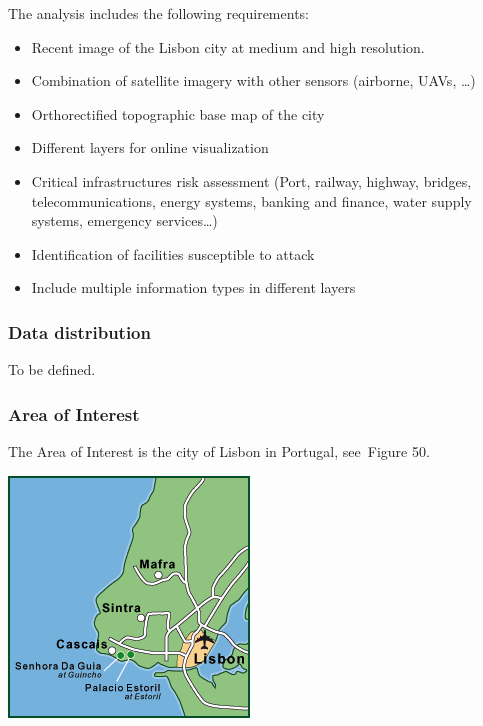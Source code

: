 \documentclass[a4paper]{article}
\newcommand\liststyleLFOviii{%
\renewcommand\labelitemi{[F0B7?]}
\renewcommand\labelitemii{o}
\renewcommand\labelitemiii{[F0A7?]}
\renewcommand\labelitemiv{[F0B7?]}
}
\begin{document}
\bigskip

{
The analysis includes the following requirements:}

\liststyleLFOviii
\begin{itemize}
\item {
Recent image of the Lisbon city at medium and high resolution.}
\item {
Combination of satellite imagery with other sensors (airborne, UAVs,
{\dots})}
\item {
Orthorectified topographic base map of the city}
\item {
Different layers for online visualization}
\item {
Critical infrastructures risk assessment (Port, railway, highway,
bridges, telecommunications, energy systems, banking and finance, water
supply systems, emergency services{\dots})}
\item {
Identification of facilities susceptible to attack}
\item {
Include multiple information types in different layers}
\end{itemize}
\subsubsection[Data distribution]{ Data
distribution}
\hypertarget{Toc381777274}{}{
To be defined.}

\subsubsection[Area of Interest\ ]{ Area of
Interest\ }
\hypertarget{Toc381777275}{}\foreignlanguage{english}{The Area of
Interest is the city of Lisbon in Portugal, see\ }Figure
50\foreignlanguage{english}{.}\ 

{\centering 
\includegraphics[width=2.52153in,height=2.52153in]{out-img58.png} \par}
\end{document}
